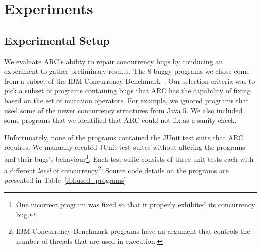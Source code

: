 \section{Experiments}
\label{sec:experiments}


\subsection{Experimental Setup}
\label{sec:experimental_setup}

We evaluate ARC's ability to repair concurrency bugs by conducing an experiment
to gather preliminary results. The 8 buggy programs we chose come from a
subset of the IBM Concurrency Benchmark~\cite{EHSU06}. Our selection criteria
was to pick a subset of programs containing bugs that ARC has the
capability of fixing based on the set of mutation operators. For example, we
ignored programs that used some of the newer concurrency structures from Java 5. We
also included some programs that we identified that ARC could not fix as a
sanity check.

Unfortunately, none of the programs contained the JUnit test suite that ARC requires.
We manually created JUnit test suites without altering the programs and their
bugs's behaviour\footnote{One incorrect program was fixed so that it properly
exhibited its concurrency bug.}. Each test suite consists of three unit tests
each with a different \textit{level} of concurrency\footnote{IBM Concurrency Benchmark
programs have an argument that controls the number of threads that are used in
execution.}. Source code details on the programs are presented in
Table~\ref{tbl:used_programs}

